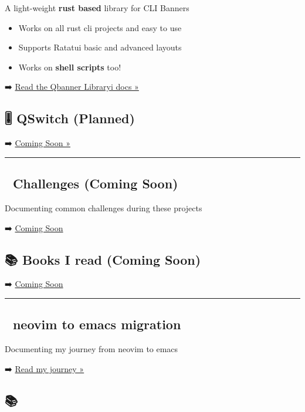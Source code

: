 \documentclass[
  letterpaper,
  DIV=11,
  numbers=noendperiod]{scrreprt}
\begin{document}
A light-weight \textbf{rust based} library for CLI Banners

\begin{itemize}
\item
  Works on all rust cli projects and easy to use
\item
  Supports Ratatui basic and advanced layouts\\
\item
  Works on \textbf{shell scripts} too!
\end{itemize}

➡️ \href{qbanner/index.qmd}{Read the Qbanner Libraryi docs »}

\subsection{🎚️ QSwitch (Planned)}\label{qswitch-planned}

➡️ \href{}{Coming Soon »}

\begin{center}\rule{0.5\linewidth}{0.5pt}\end{center}

\subsection{📡 Challenges (Coming Soon)}\label{challenges-coming-soon}

Documenting common challenges during these projects

➡️ \href{}{Coming Soon}

\subsection{📚 Books I read (Coming
Soon)}\label{books-i-read-coming-soon}

➡️ \href{}{Coming Soon}

\begin{center}\rule{0.5\linewidth}{0.5pt}\end{center}

\subsection{📡 neovim to emacs
migration}\label{neovim-to-emacs-migration}

Documenting my journey from neovim to emacs

➡️ \href{neovim2emacs/index.qmd}{Read my journey »}

\subsection{📚}\label{section-1}
\end{document}
